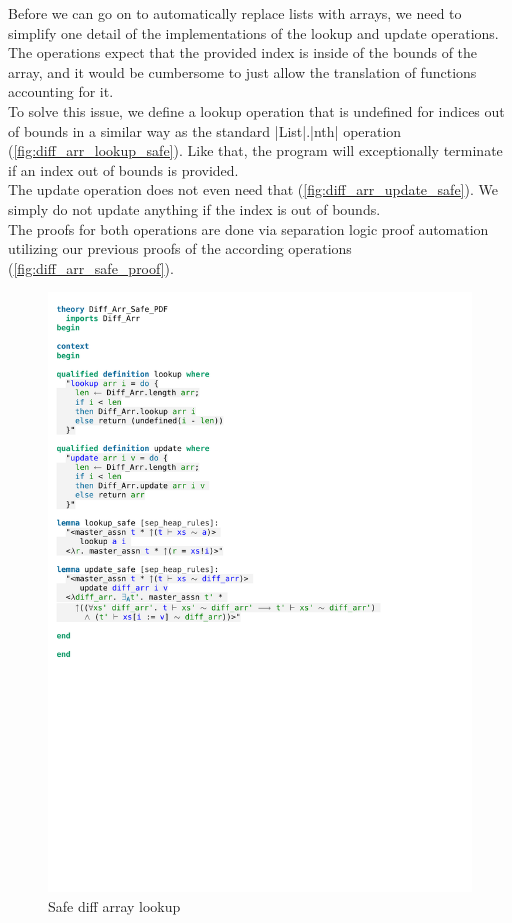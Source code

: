 Before we can go on to automatically replace lists with arrays, we need to simplify one detail of the implementations of the lookup and update operations. The operations expect that the provided index is inside of the bounds of the array, and it would be cumbersome to just allow the translation of functions accounting for it.\\
To solve this issue, we define a lookup operation that is undefined for indices out of bounds in a similar way as the standard |List|.|nth| operation (\autoref{fig:diff_arr_lookup_safe}). Like that, the program will exceptionally terminate if an index out of bounds is provided.\\
The update operation does not even need that (\autoref{fig:diff_arr_update_safe}). We simply do not update anything if the index is out of bounds.\\
The proofs for both operations are done via separation logic proof automation utilizing our previous proofs of the according operations (\autoref{fig:diff_arr_safe_proof}).


\begin{figure}[htpb]
    \includegraphics[trim={0 22,6cm 0 3,8cm}, clip, width=1.00\textwidth]{figures/Theory_Diff_Arr_Safe.pdf}
    \caption[Safe diff array lookup]{Safe diff array lookup}
    \label{fig:diff_arr_lookup_safe}
\end{figure}

